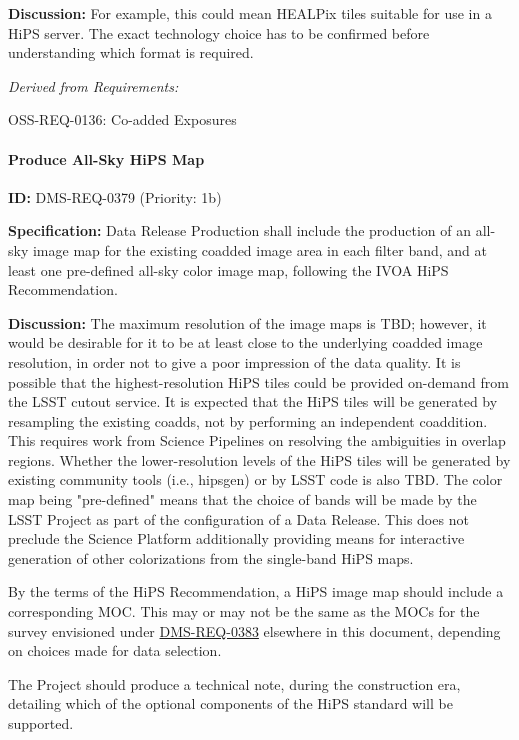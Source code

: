 \documentclass[SE,toc,lsstdraft]{lsstdoc}
\begin{document}
\textbf{Discussion:} For example, this could mean HEALPix tiles suitable for use in a HiPS server. The exact technology choice has to be confirmed before understanding which format is required.

\emph{Derived from Requirements:}

OSS-REQ-0136:
Co-added Exposures \newline

\paragraph{Produce All-Sky HiPS Map}\hfill  %

\label{DMS-REQ-0379}
\textbf{ID:} DMS-REQ-0379 (Priority: 1b)

\textbf{Specification:}
Data Release Production shall include the production of an all-sky image map for the existing coadded image area in each filter band, and at least one pre-defined all-sky color image map, following the IVOA HiPS Recommendation.

\textbf{Discussion:}
The maximum resolution of the image maps is TBD; however, it would be desirable for it to be at least close to the underlying coadded image resolution, in order not to give a poor impression of the data quality.  It is possible that the highest-resolution HiPS tiles could be provided on-demand from the LSST cutout service.  It is expected that the HiPS tiles will be generated by resampling the existing coadds, not by performing an independent coaddition.  This requires work from Science Pipelines on resolving the ambiguities in overlap regions.  Whether the lower-resolution levels of the HiPS tiles will be generated by existing community tools (i.e., hipsgen) or by LSST code is also TBD.  The color map being "pre-defined" means that the choice of bands will be made by the LSST Project as part of the configuration of a Data Release.  This does not preclude the Science Platform additionally providing means for interactive generation of other colorizations from the single-band HiPS maps.

By the terms of the HiPS Recommendation, a HiPS image map should include a corresponding MOC.  This may or may not be the same as the MOCs for the survey envisioned under \hyperref[DMS-REQ-0383]{DMS-REQ-0383} elsewhere in this document, depending on choices made for data selection.

The Project should produce a technical note, during the construction era, detailing which of the optional components of the HiPS standard will be supported.
\end{document}
